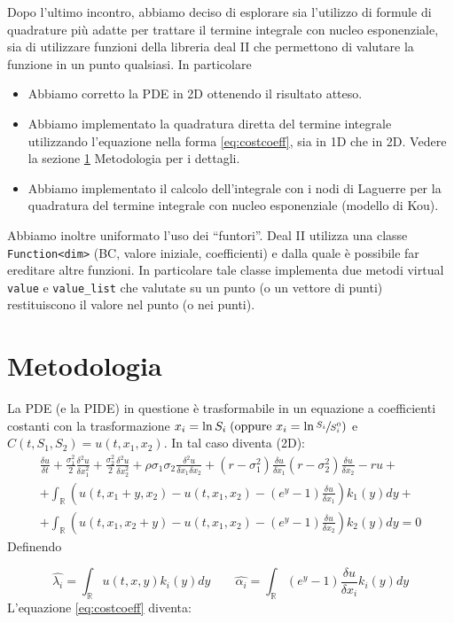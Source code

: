 \documentclass[a4paper,10pt]{article}
\newcommand{\der}[2]{\frac{\delta #1}{\delta #2}}
\newcommand{\dder}[2]{\frac{\delta^2 #1}{\delta #2^2}}
\newcommand{\dmix}[3]{\frac{\delta^2 #1}{\delta #2 \delta #3}}
\begin{document}
Dopo l'ultimo incontro, abbiamo deciso di esplorare sia l'utilizzo di formule di quadrature più adatte per trattare il termine integrale con nucleo esponenziale, sia di utilizzare funzioni della libreria deal II che permettono di valutare la funzione in un punto qualsiasi. In particolare

\begin{itemize}
 \item Abbiamo corretto la PDE in 2D ottenendo il risultato atteso.
 \item Abbiamo implementato la quadratura diretta del termine integrale utilizzando l'equazione nella forma \eqref{eq:costcoeff}, sia in 1D che in 2D. Vedere la sezione \ref{sec:metod} Metodologia per i dettagli.
 \item Abbiamo implementato il calcolo dell'integrale con i nodi di Laguerre per la quadratura del termine integrale con nucleo esponenziale (modello di Kou).
\end{itemize}

Abbiamo inoltre uniformato l'uso dei ``funtori''. Deal II utilizza una classe \verb!Function<dim>! (BC, valore iniziale, coefficienti) e dalla quale è possibile far ereditare altre funzioni. In particolare tale classe implementa due metodi virtual \verb!value! e \verb!value_list! che valutate su un punto (o un vettore di punti) restituiscono il valore nel punto (o nei punti). 

\section{Metodologia}
\label{sec:metod}
La PDE (e la PIDE) in questione è trasformabile in un equazione a coefficienti costanti con la trasformazione $x_i=\ln{S_i} \; (\text{oppure } x_i=\ln{\sfrac{S_i}{S_i^0}})$ e $C(t,S_1,S_2)=u(t,x_1,x_2)$. In tal caso diventa (2D):
{
\begin{multline}
 \der{u}{t}+\frac{\sigma_1^2}{2}\dder{u}{x_1}+\frac{\sigma_2^2}{2}\dder{u}{x_2}+\rho\sigma_1\sigma_2\dmix{u}{x_1}{x_2}+
 \left(r-\sigma_1^2\right)\der{u}{x_1}
 \left(r-\sigma_2^2\right)\der{u}{x_2}-ru+\\
 +\int_\mathbb{R}\left( u(t,x_1+y,x_2)-u(t,x_1,x_2)-(e^y-1)\der{u}{x_1}\right)k_1(y)dy+\\
 +\int_\mathbb{R}\left( u(t,x_1,x_2+y)-u(t,x_1,x_2)-(e^y-1)\der{u}{x_2}\right)k_2(y)dy=0
 \label{eq:costcoeff}
 \end{multline}
}
Definendo 

\begin{equation*}
 \hat{\lambda_i}=\int_\mathbb{R}u(t,x,y)k_i(y)dy \qquad \hat{\alpha_i}=\int_\mathbb{R}(e^y-1)\der{u}{x_i}k_i(y)dy
\end{equation*}
L'equazione \eqref{eq:costcoeff} diventa: 
\end{document}
